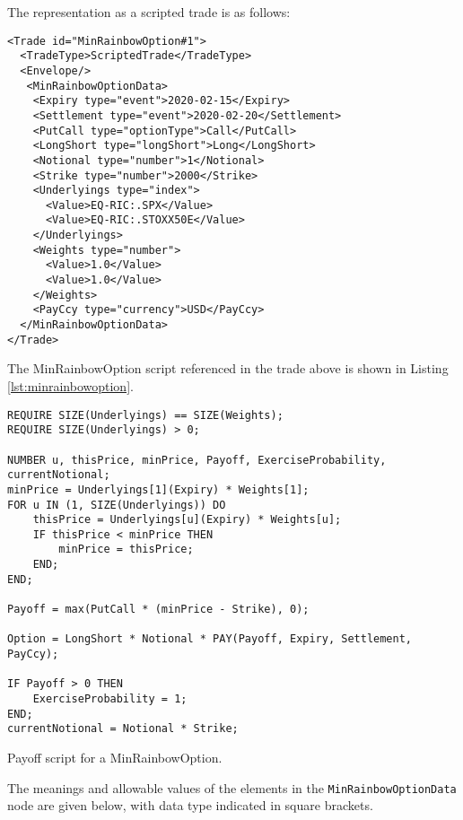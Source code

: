 The representation as a scripted trade is as follows:

\begin{verbatim}
<Trade id="MinRainbowOption#1">
  <TradeType>ScriptedTrade</TradeType>
  <Envelope/>
   <MinRainbowOptionData>
    <Expiry type="event">2020-02-15</Expiry>
    <Settlement type="event">2020-02-20</Settlement>
    <PutCall type="optionType">Call</PutCall>
    <LongShort type="longShort">Long</LongShort>
    <Notional type="number">1</Notional>
    <Strike type="number">2000</Strike>
    <Underlyings type="index">
      <Value>EQ-RIC:.SPX</Value>
      <Value>EQ-RIC:.STOXX50E</Value>
    </Underlyings>
    <Weights type="number">
      <Value>1.0</Value>
      <Value>1.0</Value>
    </Weights>
    <PayCcy type="currency">USD</PayCcy>
  </MinRainbowOptionData>
</Trade>
\end{verbatim}

The MinRainbowOption script referenced in the trade above is
shown in Listing \ref{lst:minrainbowoption}.

\begin{listing}[hbt]
\begin{verbatim}
REQUIRE SIZE(Underlyings) == SIZE(Weights);
REQUIRE SIZE(Underlyings) > 0;

NUMBER u, thisPrice, minPrice, Payoff, ExerciseProbability, currentNotional;
minPrice = Underlyings[1](Expiry) * Weights[1];
FOR u IN (1, SIZE(Underlyings)) DO
    thisPrice = Underlyings[u](Expiry) * Weights[u];
    IF thisPrice < minPrice THEN
        minPrice = thisPrice;
    END;
END;

Payoff = max(PutCall * (minPrice - Strike), 0);

Option = LongShort * Notional * PAY(Payoff, Expiry, Settlement, PayCcy);

IF Payoff > 0 THEN
    ExerciseProbability = 1;
END;
currentNotional = Notional * Strike;
\end{verbatim}
\caption{Payoff script for a MinRainbowOption.}
\label{lst:minrainbowoption}
\end{listing}

The meanings and allowable values of the elements in the
\lstinline!MinRainbowOptionData! node are given below, with data
type indicated in square brackets.

